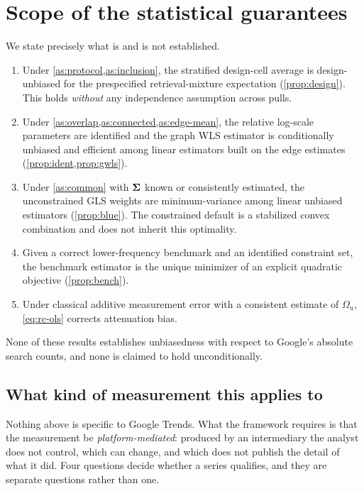 \documentclass[12pt,a4paper,oneside]{article}
\begin{document}
\section{Scope of the statistical guarantees}\label{sec:scope}

We state precisely what is and is not established.

\begin{enumerate}
\item Under \cref{as:protocol,as:inclusion}, the stratified design-cell average
is design-unbiased for the prespecified retrieval-mixture expectation
(\cref{prop:design}). This holds \emph{without} any independence assumption
across pulls.
\item Under \cref{as:overlap,as:connected,as:edge-mean}, the relative log-scale
parameters are identified and the graph WLS estimator is conditionally unbiased
and efficient among linear estimators built on the edge estimates
(\cref{prop:ident,prop:gwls}).
\item Under \cref{as:common} with $\bm{\Sigma}$ known or consistently estimated, the
unconstrained GLS weights are minimum-variance among linear unbiased estimators
(\cref{prop:blue}). The constrained default is a stabilized convex combination
and does not inherit this optimality.
\item Given a correct lower-frequency benchmark and an identified constraint
set, the benchmark estimator is the unique minimizer of an explicit quadratic
objective (\cref{prop:bench}).
\item Under classical additive measurement error with a consistent estimate of
$\Omega_u$, \eqref{eq:rc-ols} corrects attenuation bias.
\end{enumerate}

\noindent None of these results establishes unbiasedness with respect to
Google's absolute search counts, and none is claimed to hold unconditionally.

\subsection{What kind of measurement this applies to}\label{sec:appliesto}

Nothing above is specific to Google Trends. What the framework requires is that
the measurement be \emph{platform-mediated}: produced by an intermediary the
analyst does not control, which can change, and which does not publish the detail
of what it did. Four questions decide whether a series qualifies, and they are
separate questions rather than one.
\end{document}
